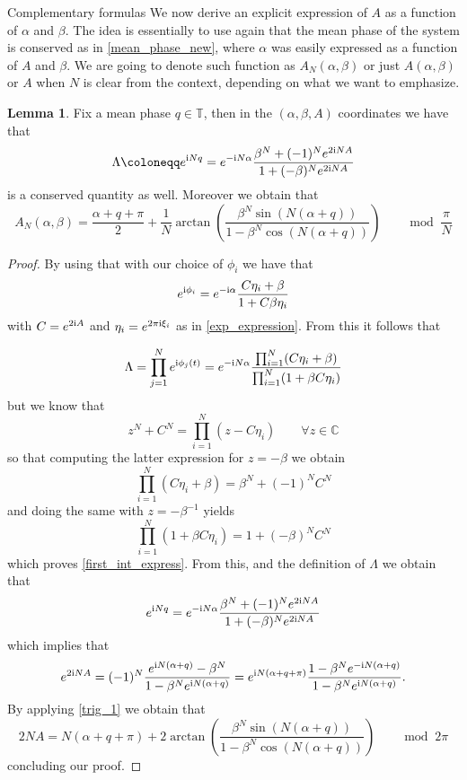 \documentclass{article}
\theoremstyle{definition}
\newtheorem{lemma}[definition]{Lemma}
\newcommand{\C}{\mathbb{C}}
\newcommand{\T}{\mathbb{T}}
\renewcommand{\i}{\textnormal{i}}
\begin{document}
\begin{section}{Complementary formulas}
We now derive an explicit expression of $A$ as a function of $\alpha$ and $\beta$. The idea is essentially to use again that the mean phase of the system is conserved as in \eqref{mean_phase_new}, where $\alpha$ was easily expressed as a function of $A$ and $\beta$. We are going to denote such function as $A_N(\alpha,\beta)$ or just $A(\alpha,\beta)$ or $A$ when $N$ is clear from the context, depending on what we want to emphasize.
\begin{lemma}\label{first_int}
Fix a mean phase $q\in\T$, then in the $(\alpha,\beta,A)$ coordinates we have that
\begin{equation}\label{first_int_express}
    \Lambda\coloneqq e^{\i Nq}=e^{-\i N\alpha}\frac{\beta^N+(-1)^Ne^{2\i NA}}{1+(-\beta)^Ne^{2\i N A}}
\end{equation}
is a conserved quantity as well. Moreover we obtain that
\begin{equation}\label{A_express}
A_N(\alpha,\beta)=\frac{\alpha+q+\pi}{2}+\frac{1}{N}\arctan\left(\frac{\beta^N\sin\left(N(\alpha+q)\right)}{1-\beta^N\cos\left(N(\alpha+q)\right)}\right)\qquad \operatorname{mod}\;\frac{\pi}{N}
\end{equation}

\end{lemma}
\begin{proof}
By using that with our choice of $\phi_i$ we have that
$$e^{\i \phi_i}=e^{-\i \alpha}\frac{C\eta_i+\beta}{1+C\beta \eta_i}$$
with $C=e^{2\i A}$ and $\eta_i=e^{2\pi\i\xi_i}$ as in \eqref{exp_expression}. From this it follows that


$$\Lambda=\prod_{j=1}^N e^{\i\phi_j(t)}=e^{-\i N\alpha}\frac{\prod_{i=1}^N(C\eta_i+\beta)}{\prod_{i=1}^N(1+\beta C\eta_i)}$$
but we know that
$$z^N+C^N=\prod_{i=1}^N(z-C\eta_i)\qquad\forall z\in\C$$
so that computing the latter expression for $z=-\beta$ we obtain
$$\prod_{i=1}^N(C\eta_i+\beta)=\beta^N+(-1)^NC^N$$
and doing the same with $z=-\beta^{-1}$ yields
$$\prod_{i=1}^N(1+\beta C\eta_i)=1+(-\beta)^NC^N$$
which proves \eqref{first_int_express}. From this, and the definition of $\Lambda$ we obtain that 
$$e^{\i Nq}=e^{-\i N\alpha}\frac{\beta^N+(-1)^Ne^{2\i NA}}{1+(-\beta)^Ne^{2\i N A}}$$
which implies that
$$e^{2\i NA}=(-1)^N\frac{e^{\i N(\alpha+q)}-\beta^N}{1-\beta^N e^{\i N(\alpha+q)}}=e^{\i N(\alpha+q+\pi)}\frac{1-\beta^Ne^{-\i N(\alpha+q)}}{1-\beta^N e^{\i N(\alpha+q)}}.$$
By applying \eqref{trig_1} we obtain that
$$2NA=N(\alpha+q+\pi)+2\arctan\left(\frac{\beta^N\sin(N(\alpha+q))}{1-\beta^N\cos(N(\alpha+q))}\right)\qquad\operatorname{mod}\;2\pi$$
concluding our proof.
\end{proof}




\end{section}
\end{document}
